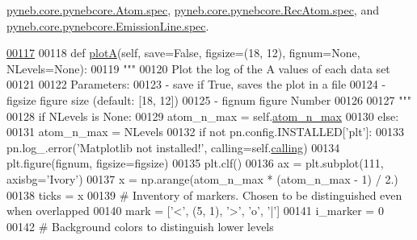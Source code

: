 \hyperlink{pynebcore_8py_source_l01220}{pyneb.\-core.\-pynebcore.\-Atom.\-spec}, \hyperlink{pynebcore_8py_source_l02637}{pyneb.\-core.\-pynebcore.\-Rec\-Atom.\-spec}, and \hyperlink{pynebcore_8py_source_l03390}{pyneb.\-core.\-pynebcore.\-Emission\-Line.\-spec}.


\begin{DoxyCode}
\hypertarget{classpyneb_1_1plot_1_1plot_atomic_data_1_1_data_plot_l00117}{}\hyperlink{classpyneb_1_1plot_1_1plot_atomic_data_1_1_data_plot_a389e18b521d2052577494c8611cb5c80}{00117} 
00118     \textcolor{keyword}{def }\hyperlink{classpyneb_1_1plot_1_1plot_atomic_data_1_1_data_plot_a389e18b521d2052577494c8611cb5c80}{plotA}(self, save=False, figsize=(18, 12), fignum=\textcolor{keywordtype}{None}, NLevels=\textcolor{keywordtype}{None}):
00119         \textcolor{stringliteral}{"""}
00120 \textcolor{stringliteral}{        Plot the log of the A values of each data set }
00121 \textcolor{stringliteral}{        }
00122 \textcolor{stringliteral}{        Parameters:}
00123 \textcolor{stringliteral}{            - save     if True, saves the plot in a file}
00124 \textcolor{stringliteral}{            - figsize  figure size (default: [18, 12])}
00125 \textcolor{stringliteral}{            - fignum    figure Number}
00126 \textcolor{stringliteral}{}
00127 \textcolor{stringliteral}{        """}
00128         \textcolor{keywordflow}{if} NLevels \textcolor{keywordflow}{is} \textcolor{keywordtype}{None}:
00129             atom\_n\_max = self.\hyperlink{classpyneb_1_1plot_1_1plot_atomic_data_1_1_data_plot_a668572cfe9a684e7195535d60d343938}{atom\_n\_max}
00130         \textcolor{keywordflow}{else}:
00131             atom\_n\_max = NLevels
00132         \textcolor{keywordflow}{if} \textcolor{keywordflow}{not} pn.config.INSTALLED[\textcolor{stringliteral}{'plt'}]:
00133             pn.log\_.error(\textcolor{stringliteral}{'Matplotlib not installed!'}, calling=self.\hyperlink{classpyneb_1_1plot_1_1plot_atomic_data_1_1_data_plot_a393a133b607541c57d5ebc5a34687e3f}{calling})
00134         plt.figure(fignum, figsize=figsize)
00135         plt.clf()
00136         ax = plt.subplot(111, axisbg=\textcolor{stringliteral}{'Ivory'})
00137         x = np.arange(atom\_n\_max * (atom\_n\_max - 1) / 2.)
00138         ticks = x
00139         \textcolor{comment}{# Inventory of markers. Chosen to be distinguished even when overlapped}
00140         mark = [\textcolor{stringliteral}{'<'}, (5, 1), \textcolor{stringliteral}{'>'}, \textcolor{stringliteral}{'o'}, \textcolor{stringliteral}{'|'}]
00141         i\_marker = 0
00142         \textcolor{comment}{# Background colors to distinguish lower levels }

\end{DoxyCode}
